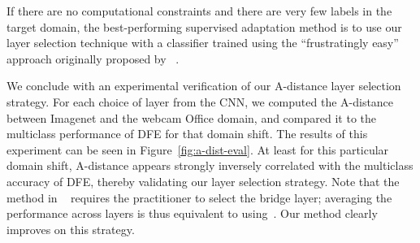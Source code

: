 If there are no computational constraints and there are very few labels in
the target domain, the best-performing supervised adaptation method is to use our layer selection technique with a classifier trained using the ``frustratingly easy'' approach originally proposed by \daume~\cite{daume}.

We conclude with an experimental verification of our A-distance layer selection strategy.
For each choice of layer from the CNN, we computed the A-distance between Imagenet and the webcam Office domain, and compared it to the multiclass performance of DFE for that domain shift.
The results of this experiment can be seen in Figure~\ref{fig:a-dist-eval}.
At least for this particular domain shift, A-distance appears strongly inversely correlated with the multiclass accuracy of DFE, thereby validating our layer selection strategy. Note that the method in ~\cite{hoffman-iclr14} requires the practitioner to select the bridge layer; averaging the performance across layers is thus equivalent to using~\cite{hoffman-iclr14}. Our method clearly improves on this strategy.
